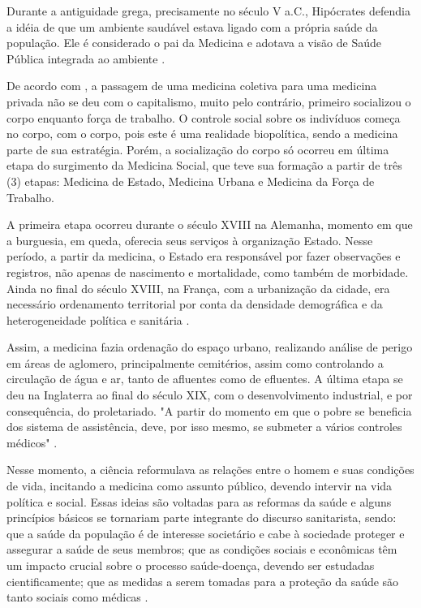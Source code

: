 \indent Durante a antiguidade grega, precisamente no século V a.C., Hipócrates defendia a idéia de que um ambiente saudável estava ligado com a própria saúde da população. Ele é considerado o pai da Medicina e adotava a visão de Saúde Pública integrada ao ambiente \cite{CFMVSaude}.

\indent De acordo com , a passagem de uma medicina coletiva para uma medicina privada não se deu com o capitalismo, muito pelo contrário, primeiro socializou o corpo enquanto força de trabalho. O controle social sobre os indivíduos começa no corpo, com o corpo, pois este é uma realidade biopolítica, sendo a medicina parte de sua estratégia. Porém, a socialização do corpo só ocorreu em última etapa do surgimento da Medicina Social, que teve sua formação a partir de três (3) etapas: Medicina de Estado, Medicina Urbana e Medicina da Força de Trabalho.

\indent A primeira etapa ocorreu durante o século XVIII na Alemanha, momento em que a burguesia, em queda, oferecia seus serviços à organização Estado. Nesse período, a partir da medicina, o Estado era responsável por fazer observações e registros, não apenas de nascimento e mortalidade, como também de morbidade. Ainda no final do século XVIII, na França, com a urbanização da cidade, era necessário ordenamento territorial por conta da densidade demográfica e da heterogeneidade política e sanitária \cite{Foucault1990Microfisica}.

\indent Assim, a medicina fazia ordenação do espaço urbano, realizando análise de perigo em áreas de aglomero, principalmente cemitérios, assim como controlando a circulação de água e ar, tanto de afluentes como de efluentes. A última etapa se deu na Inglaterra ao final do século XIX, com o desenvolvimento industrial, e por consequência, do proletariado. "A partir do momento em que o pobre se beneficia dos sistema de assistência, deve, por isso mesmo, se submeter a vários controles médicos" \cite{Foucault1990Microfisica}.

\indent Nesse momento, a ciência reformulava as relações entre o homem e suas condições de vida, incitando a medicina como assunto público, devendo intervir na vida política e social. Essas ideias são voltadas para as reformas da saúde e alguns princípios básicos se tornariam parte integrante do discurso sanitarista, sendo: que a saúde da população é de interesse societário e cabe à sociedade proteger e assegurar a saúde de seus membros; que as condições sociais e econômicas têm um impacto crucial sobre o processo saúde-doença, devendo ser estudadas cientificamente; que as medidas a serem tomadas para a proteção da saúde são tanto sociais como médicas \cite{TratadoSaudeColetiva}.


